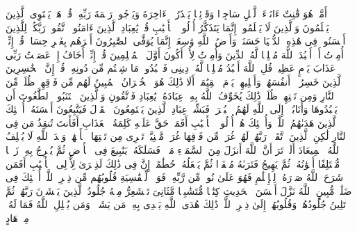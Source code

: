 أَمَّنۡ هُوَ قَٰنِتٌ ءَانَاۤءَ ٱلَّیۡلِ سَاجِدࣰا وَقَاۤئِمࣰا یَحۡذَرُ ٱلۡءَاخِرَةَ وَیَرۡجُوا۟ رَحۡمَةَ رَبِّهِۦۗ قُلۡ هَلۡ یَسۡتَوِی ٱلَّذِینَ یَعۡلَمُونَ وَٱلَّذِینَ لَا یَعۡلَمُونَۗ إِنَّمَا یَتَذَكَّرُ أُو۟لُوا۟ ٱلۡأَلۡبَٰبِ%
\stopbuffer
\startbuffer[\q:39:10]
قُلۡ یَٰعِبَادِ ٱلَّذِینَ ءَامَنُوا۟ ٱتَّقُوا۟ رَبَّكُمۡۚ لِلَّذِینَ أَحۡسَنُوا۟ فِی هَٰذِهِ ٱلدُّنۡیَا حَسَنَةࣱۗ وَأَرۡضُ ٱللَّهِ وَٰسِعَةٌۗ إِنَّمَا یُوَفَّى ٱلصَّٰبِرُونَ أَجۡرَهُم بِغَیۡرِ حِسَابࣲ%
\stopbuffer
\startbuffer[\q:39:11]
قُلۡ إِنِّیۤ أُمِرۡتُ أَنۡ أَعۡبُدَ ٱللَّهَ مُخۡلِصࣰا لَّهُ ٱلدِّینَ%
\stopbuffer
\startbuffer[\q:39:12]
وَأُمِرۡتُ لِأَنۡ أَكُونَ أَوَّلَ ٱلۡمُسۡلِمِینَ%
\stopbuffer
\startbuffer[\q:39:13]
قُلۡ إِنِّیۤ أَخَافُ إِنۡ عَصَیۡتُ رَبِّی عَذَابَ یَوۡمٍ عَظِیمࣲ%
\stopbuffer
\startbuffer[\q:39:14]
قُلِ ٱللَّهَ أَعۡبُدُ مُخۡلِصࣰا لَّهُۥ دِینِی%
\stopbuffer
\startbuffer[\q:39:15]
فَٱعۡبُدُوا۟ مَا شِئۡتُم مِّن دُونِهِۦۗ قُلۡ إِنَّ ٱلۡخَٰسِرِینَ ٱلَّذِینَ خَسِرُوۤا۟ أَنفُسَهُمۡ وَأَهۡلِیهِمۡ یَوۡمَ ٱلۡقِیَٰمَةِۗ أَلَا ذَٰلِكَ هُوَ ٱلۡخُسۡرَانُ ٱلۡمُبِینُ%
\stopbuffer
\startbuffer[\q:39:16]
لَهُم مِّن فَوۡقِهِمۡ ظُلَلࣱ مِّنَ ٱلنَّارِ وَمِن تَحۡتِهِمۡ ظُلَلࣱۚ ذَٰلِكَ یُخَوِّفُ ٱللَّهُ بِهِۦ عِبَادَهُۥۚ یَٰعِبَادِ فَٱتَّقُونِ%
\stopbuffer
\startbuffer[\q:39:17]
وَٱلَّذِینَ ٱجۡتَنَبُوا۟ ٱلطَّٰغُوتَ أَن یَعۡبُدُوهَا وَأَنَابُوۤا۟ إِلَى ٱللَّهِ لَهُمُ ٱلۡبُشۡرَىٰۚ فَبَشِّرۡ عِبَادِ%
\stopbuffer
\startbuffer[\q:39:18]
ٱلَّذِینَ یَسۡتَمِعُونَ ٱلۡقَوۡلَ فَیَتَّبِعُونَ أَحۡسَنَهُۥۤۚ أُو۟لَٰۤئِكَ ٱلَّذِینَ هَدَىٰهُمُ ٱللَّهُۖ وَأُو۟لَٰۤئِكَ هُمۡ أُو۟لُوا۟ ٱلۡأَلۡبَٰبِ%
\stopbuffer
\startbuffer[\q:39:19]
أَفَمَنۡ حَقَّ عَلَیۡهِ كَلِمَةُ ٱلۡعَذَابِ أَفَأَنتَ تُنقِذُ مَن فِی ٱلنَّارِ%
\stopbuffer
\startbuffer[\q:39:20]
لَٰكِنِ ٱلَّذِینَ ٱتَّقَوۡا۟ رَبَّهُمۡ لَهُمۡ غُرَفࣱ مِّن فَوۡقِهَا غُرَفࣱ مَّبۡنِیَّةࣱ تَجۡرِی مِن تَحۡتِهَا ٱلۡأَنۡهَٰرُۖ وَعۡدَ ٱللَّهِ لَا یُخۡلِفُ ٱللَّهُ ٱلۡمِیعَادَ%
\stopbuffer
\startbuffer[\q:39:21]
أَلَمۡ تَرَ أَنَّ ٱللَّهَ أَنزَلَ مِنَ ٱلسَّمَاۤءِ مَاۤءࣰ فَسَلَكَهُۥ یَنَٰبِیعَ فِی ٱلۡأَرۡضِ ثُمَّ یُخۡرِجُ بِهِۦ زَرۡعࣰا مُّخۡتَلِفًا أَلۡوَٰنُهُۥ ثُمَّ یَهِیجُ فَتَرَىٰهُ مُصۡفَرࣰّا ثُمَّ یَجۡعَلُهُۥ حُطَٰمًاۚ إِنَّ فِی ذَٰلِكَ لَذِكۡرَىٰ لِأُو۟لِی ٱلۡأَلۡبَٰبِ%
\stopbuffer
\startbuffer[\q:39:22]
أَفَمَن شَرَحَ ٱللَّهُ صَدۡرَهُۥ لِلۡإِسۡلَٰمِ فَهُوَ عَلَىٰ نُورࣲ مِّن رَّبِّهِۦۚ فَوَیۡلࣱ لِّلۡقَٰسِیَةِ قُلُوبُهُم مِّن ذِكۡرِ ٱللَّهِۚ أُو۟لَٰۤئِكَ فِی ضَلَٰلࣲ مُّبِینٍ%
\stopbuffer
\startbuffer[\q:39:23]
ٱللَّهُ نَزَّلَ أَحۡسَنَ ٱلۡحَدِیثِ كِتَٰبࣰا مُّتَشَٰبِهࣰا مَّثَانِیَ تَقۡشَعِرُّ مِنۡهُ جُلُودُ ٱلَّذِینَ یَخۡشَوۡنَ رَبَّهُمۡ ثُمَّ تَلِینُ جُلُودُهُمۡ وَقُلُوبُهُمۡ إِلَىٰ ذِكۡرِ ٱللَّهِۚ ذَٰلِكَ هُدَى ٱللَّهِ یَهۡدِی بِهِۦ مَن یَشَاۤءُۚ وَمَن یُضۡلِلِ ٱللَّهُ فَمَا لَهُۥ مِنۡ هَادٍ%
